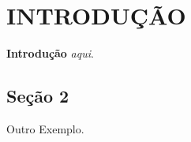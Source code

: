 
\chapter{INTRODUÇÃO}
\label{chap:introducao}

\textbf{Introdução} \textit{aqui}.



\section{Seção 2}
\label{sec:secao_2}

Outro Exemplo.


